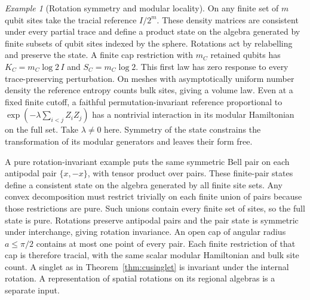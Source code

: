 \documentclass[aps,pra,onecolumn,superscriptaddress,nofootinbib,10pt]{revtex4-2}
\theoremstyle{definition}
\theoremstyle{remark}
\newtheorem{example}[theorem]{Example}
\begin{document}
\begin{example}[Rotation symmetry and modular locality]\label{ub:tracial}
On any finite set of $m$ qubit sites take the tracial reference
$I/2^m$. These density matrices are consistent under every partial trace
and define a product state on the algebra generated by finite subsets
of qubit sites indexed by the sphere. Rotations act by relabelling and
preserve the state. A finite cap restriction with $m_C$ retained qubits
has $K_C=m_C\log2\,I$ and $S_C=m_C\log2$. This first law has zero
response to every trace-preserving perturbation. On meshes with
asymptotically uniform number density the reference entropy counts bulk
sites, giving a volume law. Even at a fixed finite cutoff, a faithful
permutation-invariant reference proportional to
$\exp(-\lambda\sum_{i<j}Z_i Z_j)$ has a nontrivial interaction in its
modular Hamiltonian on the full set. Take $\lambda\ne0$ here. Symmetry of the state constrains
the transformation of its modular generators and leaves their form free.

A pure rotation-invariant example puts the same symmetric Bell pair on
each antipodal pair $\{x,-x\}$, with tensor product over pairs. These
finite-pair states define a consistent state on the algebra generated
by all finite site sets. Any convex decomposition must restrict
trivially on each finite union of pairs because those restrictions are
pure. Such unions contain every finite set of sites, so the full state
is pure. Rotations preserve antipodal pairs and the pair state is
symmetric under interchange, giving rotation invariance. An open cap
of angular radius $a\le\pi/2$ contains at most one point of every pair.
Each finite restriction of that cap is therefore tracial, with the
same scalar modular Hamiltonian and bulk site count. A singlet as in Theorem~\ref{thm:cusinglet} is invariant under
the internal rotation. A representation of spatial rotations on
its regional algebras is a separate input.
\end{example}
\end{document}
